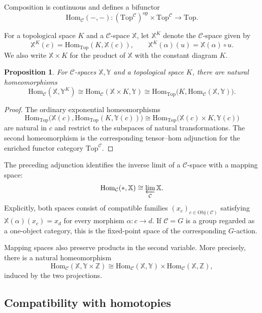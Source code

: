 \documentclass[12pt]{amsart}
\newtheorem{prop}[teo]{Proposition}
\theoremstyle{definition}
\theoremstyle{remark}
\numberwithin{figure}{section}%
\newcommand{\CC}{\mathcal{C}}
\newcommand{\op}{\mathrm{op}}
\newcommand{\Top}{\mathrm{Top}}
\newcommand{\X}{\mathbb{X}}
\newcommand{\Y}{\mathbb{Y}}
\newcommand{\Hom}{\mathrm{Hom}}
\newcommand{\Z}{\mathbb{Z}}
\newcommand{\Obj}{\mathrm{Obj}}
\begin{document}
Composition is continuous and defines a bifunctor
\[
\Hom_{\CC}(-,-)\colon
(\Top^{\CC})^{\op}\times\Top^{\CC}\longrightarrow\Top.
\]

For a topological space $K$ and a $\CC$-space $\X$, let $\X^K$ denote
the $\CC$-space given by
\[
\X^K(c)=\Hom_{\Top}(K,\X(c)),
\qquad
\X^K(\alpha)(u)=\X(\alpha)\circ u.
\]
We also write $\X\times K$ for the product of $\X$ with the constant
diagram $K$.

\begin{prop}\label{prop:adjoint}
For $\CC$-spaces $\X,\Y$ and a topological space $K$, there are natural
homeomorphisms
\[
\Hom_{\CC}(\X,\Y^K)
\cong
\Hom_{\CC}(\X\times K,\Y)
\cong
\Hom_{\Top}\bigl(K,\Hom_{\CC}(\X,\Y)\bigr).
\]
\end{prop}

\begin{proof}
The ordinary exponential homeomorphisms
\[
\Hom_{\Top}\bigl(\X(c),\Hom_{\Top}(K,\Y(c))\bigr)
\cong
\Hom_{\Top}\bigl(\X(c)\times K,\Y(c)\bigr)
\]
are natural in $c$ and restrict to the subspaces of natural
transformations. The second homeomorphism is the corresponding
tensor--hom adjunction for the enriched functor category
$\Top^{\CC}$.
\end{proof}

The preceding adjunction identifies the inverse limit of a $\CC$-space
with a mapping space:
\[
\Hom_{\CC}(*,\X)\cong\varprojlim_{\CC}\X.
\]
Explicitly, both spaces consist of compatible families
$(x_c)_{c\in\Obj(\CC)}$ satisfying
$\X(\alpha)(x_c)=x_d$ for every morphism $\alpha\colon c\to d$. If
$\CC=G$ is a group regarded as a one-object category, this is the
fixed-point space of the corresponding $G$-action.

Mapping spaces also preserve products in the second variable. More
precisely, there is a natural homeomorphism
\begin{equation}\label{eq:mapping-space-product}
\Hom_{\CC}(\X,\Y\times\Z)
\cong
\Hom_{\CC}(\X,\Y)\times\Hom_{\CC}(\X,\Z),
\end{equation}
induced by the two projections.

\subsection{Compatibility with homotopies}
\end{document}
